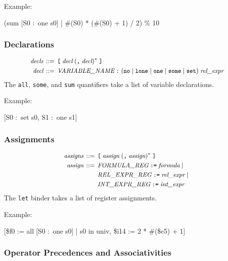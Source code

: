 \documentclass[a4paper,12pt]{article}
\begin{document}
    Example:

    \pre
    \ttfamily\small
    (sum [S0 :~one s0] | \#(S0) * (\#(S0) + 1) / 2) \% 10
    \post

    \subsubsection{Declarations}
    \label{declarations}

    $$\small\begin{aligned}
                \textit{decls} & \,::=\, \verb|[|\; \textit{decl}\; (\verb|,|\; \textit{decl})^*\; \verb|]| \\
                \textit{decl} & \,::=\, \textit{VARIABLE\_NAME}\; \verb|:|\; (\verb|no| \mid \verb|lone| \mid \verb|one| \mid \verb|some| \mid \verb|set|)\; \textit{rel\_expr}
    \end{aligned}$$
%
    The \verb|all|, \verb|some|, and \verb|sum| quantifiers take a list of variable
    declarations.

    Example:

    \pre
    \ttfamily\small
    [S0 :~set s0, S1 :~one s1]
    \post

    \subsubsection{Assignments}
    \label{assignments}

    $$\small\begin{aligned}
                \textit{assigns} \,::=\,{} & \verb|[|\; \textit{assign}\; (\verb|,|\; \textit{assign})^*\;\verb|]| \\
                \textit{assign} \,::=\,{} & \textit{FORMULA\_REG}\; \verb|:=|\; \textit{formula} \mid {} \\
                & \textit{REL\_EXPR\_REG}\; \verb|:=|\; \textit{rel\_expr} \mid {} \\
                & \textit{INT\_EXPR\_REG}\; \verb|:=|\; \textit{int\_expr}
    \end{aligned}$$
%
    The \verb|let| binder takes a list of register assignments.

    Example:

    \pre
    \ttfamily\small
    [\$f0 := all [S0 :~one s0] | s0 in univ, \$i14 := 2 * \#(\$e5) + 1]
    \post

    \subsubsection{Operator Precedences and Associativities}
    \label{operator-precedences-and-associativities}
\end{document}
